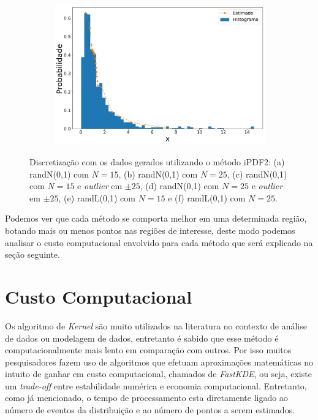 \begin{figure}[H]
\begin{subfigure}[b]{0.45\textwidth}
		\includegraphics[width=\linewidth]{./figuras/iPDF2_lognormal_25_1_1000_0}
		\caption{}
		\label{fig:ipdf2_lognorm25_data}
	\end{subfigure}
	\caption{Discretização com os dados gerados utilizando o método \ac{iPDF2}: (a) randN(0,1) com $N = 15$, (b) randN(0,1) com $N = 25$, (c) randN(0,1) com $N = 15$ e \textit{outlier} em $\pm 25$, (d) randN(0,1) com $N = 25$ e \textit{outlier} em $\pm 25$, (e) randL(0,1) com $ N = 15 $ e (f) randL(0,1) com $ N = 25 $.}
	\label{fig:ipdf2_data}
\end{figure}


Podemos ver que cada método se comporta melhor em uma determinada região, botando mais ou menos pontos nas regiões de interesse, deste modo podemos analisar o custo computacional envolvido para cada método que será explicado na seção seguinte.

\section{Custo Computacional}

Os algoritmo de \textit{Kernel} são muito utilizados na literatura no contexto de análise de dados ou modelagem de dados, entretanto é sabido que esse método é computacionalmente mais lento em comparação com outros. Por isso muitos pesquisadores fazem uso de algoritmos que efetuam aproximações matemáticas no intuito de ganhar em custo computacional, chamados de \textit{FastKDE}, ou seja, existe um \textit{trade-off} entre estabilidade numérica e economia computacional. Entretanto, como já mencionado, o tempo de processamento esta diretamente ligado ao número de eventos da distribuição e ao número de pontos a serem estimados.

